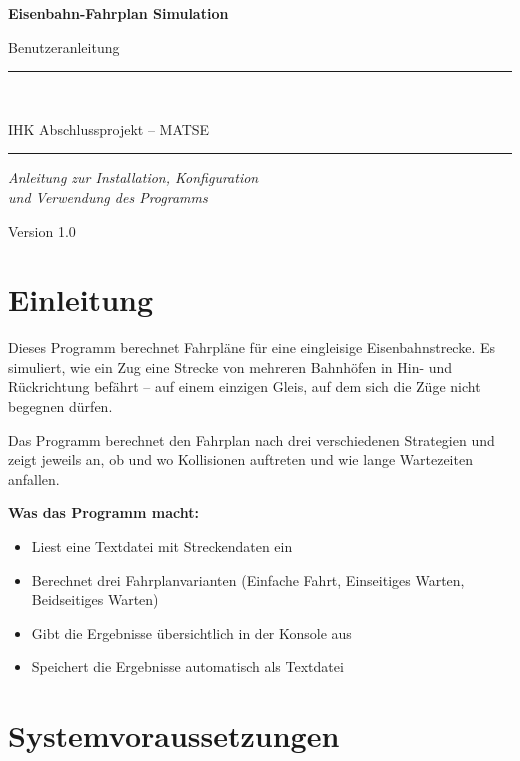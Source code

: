 \documentclass[12pt,a4paper]{article}
\begin{document}
\begin{titlepage}
    \centering
    \vspace*{2cm}
    {\Huge\bfseries Eisenbahn-Fahrplan Simulation\par}
    \vspace{0.5cm}
    {\Large Benutzeranleitung\par}
    \vspace{2cm}
    \rule{\linewidth}{0.4pt}\\[0.5cm]
    {\large IHK Abschlussprojekt -- MATSE\par}
    \rule{\linewidth}{0.4pt}
    \vspace{2cm}
    {\large\itshape Anleitung zur Installation, Konfiguration\\und Verwendung des Programms\par}
    \vfill
    {\large Version 1.0 \par}
\end{titlepage}

\tableofcontents
\newpage

\section{Einleitung}

Dieses Programm berechnet Fahrpläne für eine eingleisige Eisenbahnstrecke. Es simuliert, wie ein Zug eine Strecke von mehreren Bahnhöfen in Hin- und Rückrichtung befährt -- auf einem einzigen Gleis, auf dem sich die Züge nicht begegnen dürfen.

Das Programm berechnet den Fahrplan nach drei verschiedenen Strategien und zeigt jeweils an, ob und wo Kollisionen auftreten und wie lange Wartezeiten anfallen.

\textbf{Was das Programm macht:}
\begin{itemize}
    \item Liest eine Textdatei mit Streckendaten ein
    \item Berechnet drei Fahrplanvarianten (Einfache Fahrt, Einseitiges Warten, Beidseitiges Warten)
    \item Gibt die Ergebnisse übersichtlich in der Konsole aus
    \item Speichert die Ergebnisse automatisch als Textdatei
\end{itemize}

\section{Systemvoraussetzungen}
\end{document}
